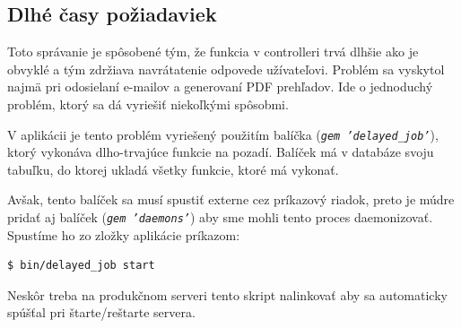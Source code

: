 \subsection{Dlhé časy požiadaviek}
\label{sec:request_time}

Toto správanie je spôsobené tým, že funkcia v controlleri trvá dlhšie ako je obvyklé a tým zdržiava navrátatenie odpovede užívateľovi.
Problém sa vyskytol najmä pri odosielaní e-mailov a generovaní PDF prehľadov. Ide o jednoduchý problém, ktorý sa dá vyriešiť niekoľkými spôsobmi. 

V aplikácii je tento problém vyriešený použitím balíčka (\emph{\texttt{gem 'delayed\_job'}}), ktorý vykonáva dlho-trvajúce funkcie na pozadí. Balíček má v databáze svoju tabuľku, do ktorej ukladá všetky funkcie, ktoré má vykonať. 

Avšak, tento balíček sa musí spustiť externe cez príkazový riadok, preto je múdre pridať aj balíček (\emph{\texttt{gem 'daemons'}}) aby sme mohli tento proces daemonizovať. Spustíme ho zo zložky aplikácie príkazom:

\begin{verbatim}
$ bin/delayed_job start
\end{verbatim}

Neskôr treba na produkčnom serveri tento skript nalinkovať aby sa automaticky spúšťal pri štarte/reštarte servera.